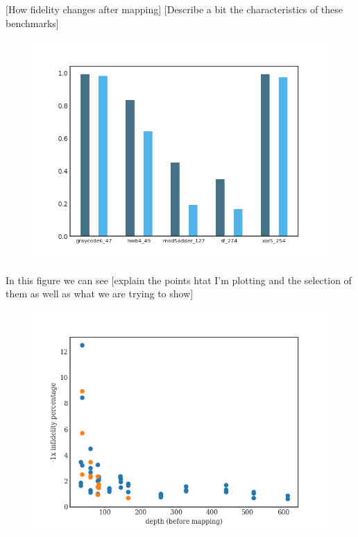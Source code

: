 \label{tab:map_selected_benchs}
[How fidelity changes after mapping]
[Describe a bit the characteristics of these benchmarks]

\begin{figure}[htbp]
\centering
\includegraphics[width=\textwidth]{figures/f_diff_bar_plot.png}
\caption{\label{fig:org047ac6b}
}
\end{figure}
In this figure we can see [explain the points htat I'm plotting and the selection of them as well as what we are trying to show]

\begin{figure}[htbp]
\centering
\includegraphics[width=\textwidth]{figures/infid_percentage_depth_before_mapping.png}
\caption{\label{fig:orgd3d0e79}
}
\end{figure}

